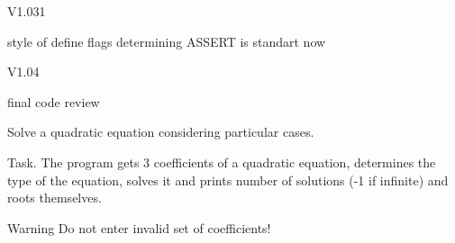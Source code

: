 \begin{DoxyParagraph}{\-V1.031}

\begin{DoxyItemize}
\item style of define flags determining \-A\-S\-S\-E\-R\-T is standart now
\end{DoxyItemize}
\end{DoxyParagraph}
\begin{DoxyParagraph}{\-V1.04}

\begin{DoxyItemize}
\item final code review
\end{DoxyItemize}
\end{DoxyParagraph}
\-Solve a quadratic equation considering particular cases.

\begin{DoxyParagraph}{\-Task.}
\-The program gets 3 coefficients of a quadratic equation, determines the type of the equation, solves it and prints number of solutions (-\/1 if infinite) and roots themselves.
\end{DoxyParagraph}
\begin{DoxyWarning}{\-Warning}
\-Do not enter invalid set of coefficients! 
\end{DoxyWarning}
